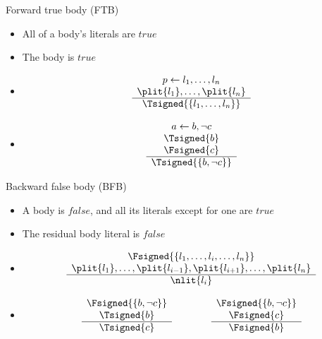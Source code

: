 \begin{frame}{Forward true body (FTB)}
\begin{itemize}
\item {} All of a body's literals are $\mathit{true}$
\item {} The body is $\mathit{true}$
\item {}
\[
\begin{array}{c}
p \leftarrow l_1,\dots,l_n \\
\plit{l_1},\dots,\plit{l_n} \\\hline
\Tsigned{\{l_1,\dots,l_n\}}
\end{array}
\]
\item<2-> 
\[
\begin{array}{c}
a \leftarrow b, \neg c \\
\Tsigned{b} \\
\Fsigned{c} \\\hline
\Tsigned{\{b, \neg c\}}
\end{array}
\]
\end{itemize}
\end{frame}
\begin{frame}{Backward false body (BFB)}
\begin{itemize}
\item {}
  A body is $\mathit{false}$, and all its literals except for one are $\mathit{true}$
\item {} The residual body literal is $\mathit{false}$
\item {}
\[
\begin{array}{c}
\Fsigned{\{l_1,\dots,l_i,\dots,l_n\}} \\
\plit{l_1},\dots,\plit{l_{i-1}},\plit{l_{i+1}},\dots,\plit{l_n} \\\hline
\nlit{l_i}
\end{array}
\]
\item<2-> 
\[
\begin{array}{c}
\Fsigned{\{b, \neg c\}} \\
\Tsigned{b} \\\hline
\Tsigned{c}
\end{array}
\qquad\qquad
\begin{array}{c}
\Fsigned{\{b, \neg c\}} \\
\Fsigned{c} \\\hline
\Fsigned{b}
\end{array}
\]
\end{itemize}
\end{frame}
